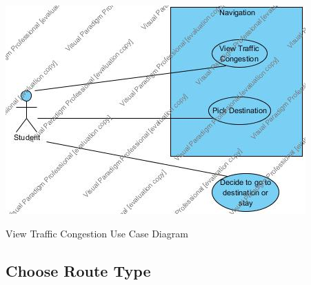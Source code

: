 \documentclass[12pt]{article}
\begin{document}
\includegraphics[width=\linewidth]{UseCaseDiagram_ViewTrafficCongestion.jpg}

View Traffic Congestion Use Case Diagram





	\subsection{Choose Route Type}
\end{document}
